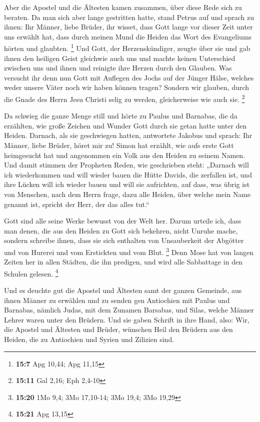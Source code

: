  Aber die Apostel und die Ältesten kamen zusammen, über
diese Rede sich zu beraten.  Da man sich aber lange
gestritten hatte, stand Petrus auf und sprach zu ihnen: Ihr Männer,
liebe Brüder, ihr wisset, dass Gott lange vor dieser Zeit unter uns
erwählt hat, dass durch meinen Mund die Heiden das Wort des Evangeliums
hörten und glaubten. \footnote{\textbf{15:7} Apg 10,44; Apg 11,15}
 Und Gott, der Herzenskündiger, zeugte über sie und gab
ihnen den heiligen Geist gleichwie auch uns  und machte
keinen Unterschied zwischen uns und ihnen und reinigte ihre Herzen durch
den Glauben.  Was versucht ihr denn nun Gott mit Auflegen
des Jochs auf der Jünger Hälse, welches weder unsere Väter noch wir
haben können tragen?  Sondern wir glauben, durch die Gnade
des Herrn Jesu Christi selig zu werden, gleicherweise wie auch sie.
\footnote{\textbf{15:11} Gal 2,16; Eph 2,4-10}

 Da schwieg die ganze Menge still und hörte zu Paulus und
Barnabas, die da erzählten, wie große Zeichen und Wunder Gott durch sie
getan hatte unter den Heiden.  Darnach, als sie geschwiegen
hatten, antwortete Jakobus und sprach: Ihr Männer, liebe Brüder, höret
mir zu!  Simon hat erzählt, wie aufs erste Gott heimgesucht
hat und angenommen ein Volk aus den Heiden zu seinem Namen.
 Und damit stimmen der Propheten Reden, wie geschrieben
steht:  „Darnach will ich wiederkommen und will wieder
bauen die Hütte Davids, die zerfallen ist, und ihre Lücken will ich
wieder bauen und will sie aufrichten,  auf dass, was übrig
ist von Menschen, nach dem Herrn frage, dazu alle Heiden, über welche
mein Name genannt ist, spricht der Herr, der das alles tut.``

 Gott sind alle seine Werke bewusst von der Welt her.
 Darum urteile ich, dass man denen, die aus den Heiden zu
Gott sich bekehren, nicht Unruhe mache,  sondern schreibe
ihnen, dass sie sich enthalten von Unsauberkeit der Abgötter und von
Hurerei und vom Erstickten und vom Blut. \footnote{\textbf{15:20} 1Mo
  9,4; 3Mo 17,10-14; 3Mo 19,4; 3Mo 19,29}  Denn Mose hat
von langen Zeiten her in allen Städten, die ihn predigen, und wird alle
Sabbattage in den Schulen gelesen. \footnote{\textbf{15:21} Apg 13,15}

 Und es deuchte gut die Apostel und Ältesten samt der
ganzen Gemeinde, aus ihnen Männer zu erwählen und zu senden gen
Antiochien mit Paulus und Barnabas, nämlich Judas, mit dem Zunamen
Barsabas, und Silas, welche Männer Lehrer waren unter den Brüdern.
 Und sie gaben Schrift in ihre Hand, also: Wir, die Apostel
und Ältesten und Brüder, wünschen Heil den Brüdern aus den Heiden, die
zu Antiochien und Syrien und Zilizien sind.

